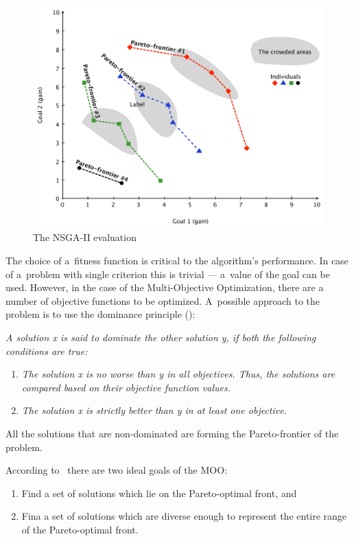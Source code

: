 \begin{figure}
  \centering \includegraphics[scale=0.55]{img/nsga}
  \caption{The NSGA-II evaluation}
  \label{nsga}
\end{figure}

The choice of a~fitness function is critical to the algorithm's
performance. In case of a~problem with single criterion this is trivial ---
a~value of the goal can be used. However, in the case of the Multi-Objective
Optimization, there are a number of objective functions to be
optimized. A~possible approach to the problem is to use the dominance
principle (\cite{Gol89}):

\textit{A solution x is said to dominate the other solution y, if both the
  following conditions are true:}
\begin{enumerate}
\item \textit{The solution x is no worse than y in all objectives. Thus, the
    solutions are compared based on their objective function values.}
\item \textit{The solution x is strictly better than y in at least one
    objective.}
\end{enumerate}

All the solutions that are non-dominated are forming the Pareto-frontier of
the problem.

According to~\cite{Deb08} there are two ideal goals of the MOO:
\begin{enumerate}
\item Find a set of solutions which lie on the Pareto-optimal front, and
\item Fina a set of solutions which are diverse enough to represent the entire
  range of the Pareto-optimal front.
\end{enumerate}

